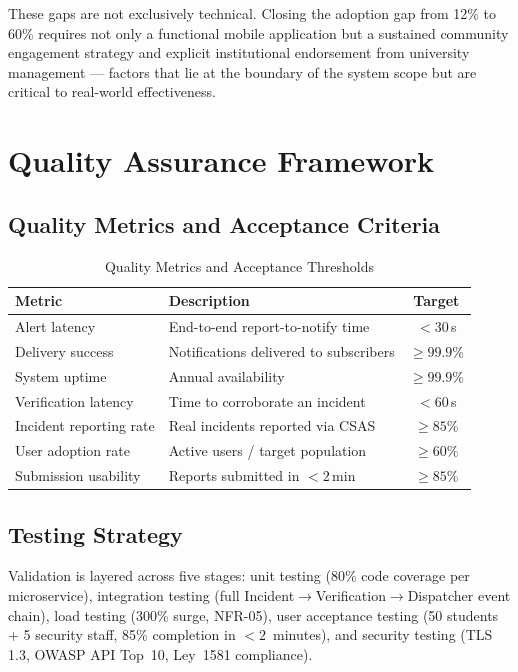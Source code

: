 \documentclass[11pt,a4paper]{article}
\begin{document}
These gaps are not exclusively technical. Closing the adoption gap from 12\% to 60\% requires not only a functional mobile application but a sustained community engagement strategy and explicit institutional endorsement from university management --- factors that lie at the boundary of the system scope but are critical to real-world effectiveness.


\section{Quality Assurance Framework}

\subsection{Quality Metrics and Acceptance Criteria}

\begin{table}[H]
\centering
\caption{Quality Metrics and Acceptance Thresholds}
\label{tab:qa}
\small
\begin{tabular}{l l c}
\toprule
\textbf{Metric} & \textbf{Description} & \textbf{Target} \\
\midrule
Alert latency & End-to-end report-to-notify time & $<30$\,s \\
Delivery success & Notifications delivered to subscribers & $\geq99.9\%$ \\
System uptime & Annual availability & $\geq99.9\%$ \\
Verification latency & Time to corroborate an incident & $<60$\,s \\
Incident reporting rate & Real incidents reported via CSAS & $\geq85\%$ \\
User adoption rate & Active users / target population & $\geq60\%$ \\
Submission usability & Reports submitted in $<2$\,min & $\geq85\%$ \\
\bottomrule
\end{tabular}
\end{table}

\subsection{Testing Strategy}

Validation is layered across five stages: unit testing (80\% code coverage per microservice), integration testing (full Incident$\to$Verification$\to$Dispatcher event chain), load testing (300\% surge, NFR-05), user acceptance testing (50 students + 5 security staff, 85\% completion in $<2$~minutes), and security testing (TLS 1.3, OWASP API Top~10, Ley~1581 compliance).
\end{document}
